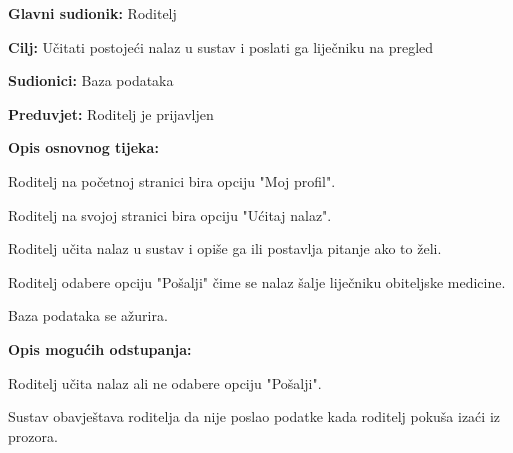 					\noindent {}
					\begin{packed_item}
						
						\item \textbf{Glavni sudionik: }Roditelj
						\item  \textbf{Cilj:} Učitati postojeći nalaz u sustav i poslati ga liječniku na pregled
						\item  \textbf{Sudionici:} Baza podataka
						\item  \textbf{Preduvjet:} Roditelj je prijavljen
						\item  \textbf{Opis osnovnog tijeka:}
						
						\item[] \begin{packed_enum}
							
							\item Roditelj na početnoj stranici bira opciju "Moj profil".
							\item Roditelj na svojoj stranici bira opciju "Ućitaj nalaz".
							\item Roditelj učita nalaz u sustav i opiše ga ili postavlja pitanje ako to želi.
							\item Roditelj odabere opciju "Pošalji" čime se nalaz šalje liječniku obiteljske medicine.
							\item Baza podataka se ažurira.
						\end{packed_enum}
						
						\item  \textbf{Opis mogućih odstupanja:}
						
						\item[] \begin{packed_item}
							
							\item[4.a] Roditelj učita nalaz ali ne odabere opciju "Pošalji".
							\item[] \begin{packed_enum}
								
								\item Sustav obavještava roditelja da nije poslao podatke kada roditelj pokuša izaći iz prozora.
							\end{packed_enum}
							
							
						\end{packed_item}
					\end{packed_item}
					
